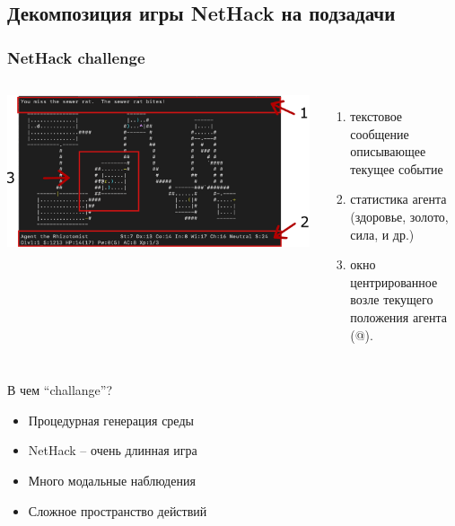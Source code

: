 \subsection{Декомпозиция игры NetHack на подзадачи}

\begin{frame}
\frametitle{NetHack challenge}
\begin{columns}
  \centering
  \includegraphics[width=1\linewidth]{images/nethack_map_view.pdf}
\begin{enumerate}
    \item текстовое сообщение описывающее текущее событие
    \item статистика агента (здоровье, золото, сила, и др.) 
    \item окно центрированное возле текущего положения агента (@).
\end{enumerate}
\end{columns} 
\vspace{20pt}
В чем ``challange''?
\begin{itemize}
    \item Процедурная генерация среды
    \item NetHack – очень длинная игра
    \item Много модальные наблюдения
    \item Сложное пространство действий
\end{itemize}


\end{frame}


